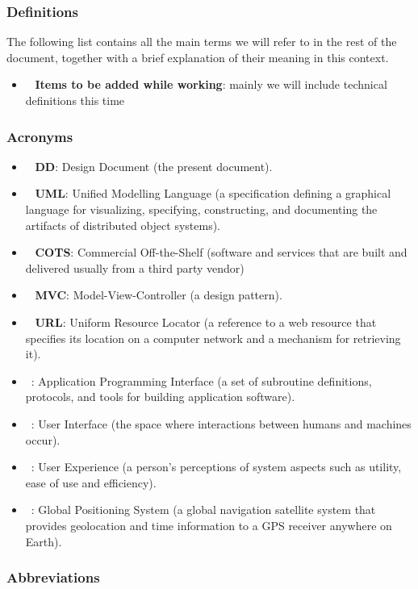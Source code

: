 \subsubsection{Definitions}

The following list contains all the main terms we will refer to in the rest of the document, together with a brief explanation of their meaning in this context.

\begin{itemize}
\item~ \textbf{Items to be added while working}: mainly we will include technical definitions this time
\end{itemize}

\subsubsection{Acronyms}

\begin{itemize}
\item~ \textbf{DD}: Design Document (the present document).
\item~ \textbf{UML}: Unified Modelling Language (a specification defining a graphical language for visualizing, specifying, constructing, and documenting the artifacts of distributed object systems).
\item~ \textbf{COTS}: Commercial Off-the-Shelf (software and services that are built and delivered usually from a third party vendor)
\item~ \textbf{MVC}: Model-View-Controller (a design pattern).
\item~ \textbf{URL}: Uniform Resource Locator (a reference to a web resource that specifies its location on a computer network and a mechanism for retrieving it).
\item~: Application Programming Interface (a set of subroutine definitions, protocols, and tools for building application software).
\item~: User Interface (the space where interactions between humans and machines occur).
\item~: User Experience (a person’s perceptions of system aspects such as utility, ease of use and efficiency).
\item~: Global Positioning System (a global navigation satellite system that provides geolocation and time information to a GPS receiver anywhere on Earth).
\end{itemize}

\subsubsection{Abbreviations}

